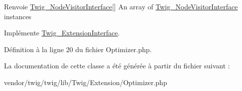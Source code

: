 \begin{DoxyReturn}{Renvoie}
\hyperlink{interface_twig___node_visitor_interface}{Twig\+\_\+\+Node\+Visitor\+Interface}\mbox{[}\mbox{]} An array of \hyperlink{interface_twig___node_visitor_interface}{Twig\+\_\+\+Node\+Visitor\+Interface} instances 
\end{DoxyReturn}


Implémente \hyperlink{interface_twig___extension_interface_aec02093179d390d22ae4083f23a1d74a}{Twig\+\_\+\+Extension\+Interface}.



Définition à la ligne 20 du fichier Optimizer.\+php.



La documentation de cette classe a été générée à partir du fichier suivant \+:\begin{DoxyCompactItemize}
\item 
vendor/twig/twig/lib/\+Twig/\+Extension/Optimizer.\+php\end{DoxyCompactItemize}
